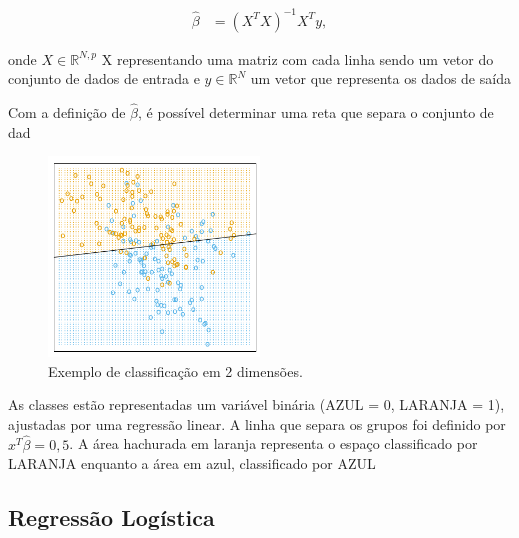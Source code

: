 \begin{equation}
  \label{eq:solucao_minimos_quadrados}
  \begin{aligned}
\hat{\beta} &= (X^{T}X)^{-1}X^{T}y, 
  \end{aligned}  
\end{equation}

onde \begin{math} X \in \mathbb{R}^{N,p} \end{math} X representando uma matriz com cada linha sendo um vetor do conjunto de dados de entrada e \begin{math}y \in \mathbb{R}^{N}\end{math} um vetor que representa os dados de saída \footnotemark {}

Com a definição de \begin{math}\hat{\beta}\end{math}, é possível determinar uma reta que separa o conjunto de dad

\begin{figure}[!ht]
\caption{Exemplo de classificação em 2 dimensões.}
\centerline{\includegraphics[width=0.5\textwidth]{img/hiperplano}}
\end{figure}



 As classes estão representadas um variável binária (AZUL = 0, LARANJA = 1), ajustadas por uma regressão linear. A linha que separa os grupos foi definido por \begin{math}x^{T}\hat{\beta} = 0,5\end{math}. A área hachurada em laranja representa o espaço classificado por LARANJA enquanto a área em azul, classificado por AZUL

\subsection{Regressão Logística}

